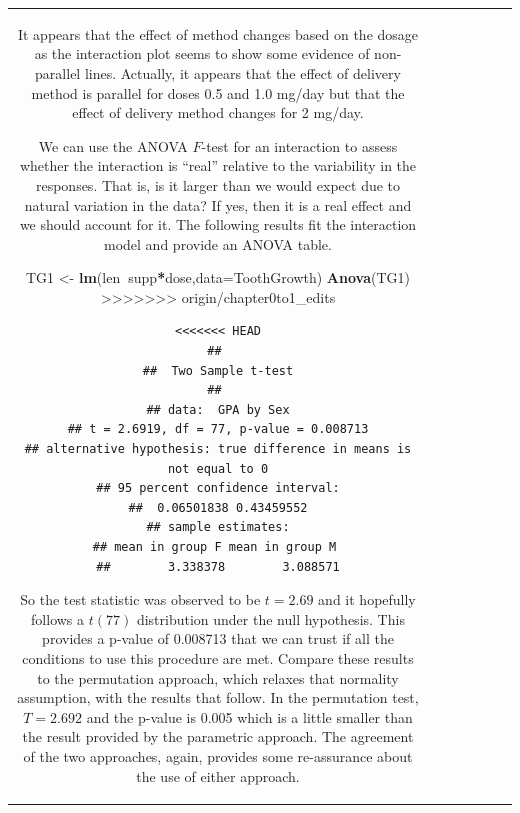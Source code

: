 \documentclass[]{book}
\newenvironment{Shaded}{\begin{snugshade}}{\end{snugshade}}
\newcommand{\KeywordTok}[1]{\textcolor[rgb]{0.13,0.29,0.53}{\textbf{#1}}}
\newcommand{\DataTypeTok}[1]{\textcolor[rgb]{0.13,0.29,0.53}{#1}}
\newcommand{\StringTok}[1]{\textcolor[rgb]{0.31,0.60,0.02}{#1}}
\newcommand{\OperatorTok}[1]{\textcolor[rgb]{0.81,0.36,0.00}{\textbf{#1}}}
\newcommand{\NormalTok}[1]{#1}
\theoremstyle{definition}
\theoremstyle{definition}
\theoremstyle{remark}
\begin{document}
\begin{longtable}[]{@{}ccccccc@{}}
\begin{minipage}[b]{0.10\columnwidth}
\begin{Shaded}
\begin{Highlighting}[]
\begin{Shaded}
\begin{Highlighting}[]
It appears that the effect of method changes based on the dosage as the
interaction plot seems to show some evidence of non-parallel lines.
Actually, it appears that the effect of delivery method is parallel for
doses 0.5 and 1.0 mg/day but that the effect of delivery method changes
for 2 mg/day.

We can use the ANOVA \(F\)-test for an interaction to assess whether the
interaction is ``real'' relative to the variability in the responses.
That is, is it larger than we would expect due to natural variation in
the data? If yes, then it is a real effect and we should account for it.
The following results fit the interaction model and provide an ANOVA
table.

\begin{Shaded}
\begin{Highlighting}[]
\NormalTok{TG1 <-}\StringTok{ }\KeywordTok{lm}\NormalTok{(len}\OperatorTok{~}\NormalTok{supp}\OperatorTok{*}\NormalTok{dose,}\DataTypeTok{data=}\NormalTok{ToothGrowth)}
\KeywordTok{Anova}\NormalTok{(TG1)}
>>>>>>> origin/chapter0to1_edits
\end{Highlighting}
\end{Shaded}

\begin{verbatim}
<<<<<<< HEAD
## 
##  Two Sample t-test
## 
## data:  GPA by Sex
## t = 2.6919, df = 77, p-value = 0.008713
## alternative hypothesis: true difference in means is not equal to 0
## 95 percent confidence interval:
##  0.06501838 0.43459552
## sample estimates:
## mean in group F mean in group M 
##        3.338378        3.088571
\end{verbatim}

So the test statistic was observed to be \(t=2.69\) and it hopefully
follows a \(t(77)\) distribution under the null hypothesis. This
provides a p-value of 0.008713 that we can trust if all the conditions
to use this procedure are met. Compare these results to the permutation
approach, which relaxes that normality assumption, with the results that
follow. In the permutation test, \(T=2.692\) and the p-value is 0.005
which is a little smaller than the result provided by the parametric
approach. The agreement of the two approaches, again, provides some
re-assurance about the use of either approach.


\end{Highlighting}
\end{Shaded}
\end{Highlighting}
\end{Shaded}
\end{minipage}
\end{longtable}
\end{document}
